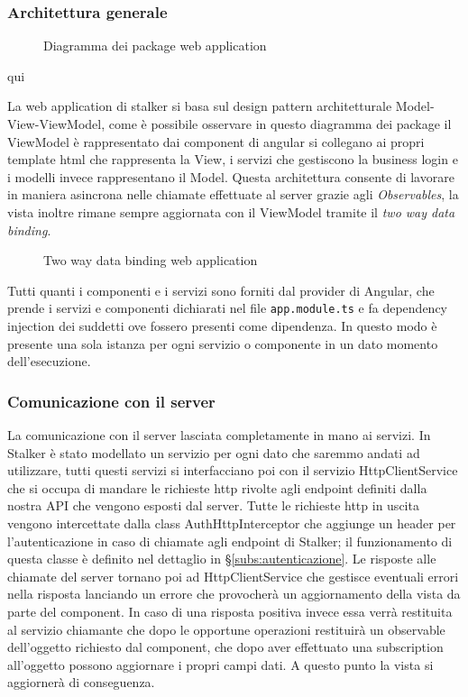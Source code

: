 \documentclass[../../manuale-manutentore.tex]{subfiles}
\begin{document}
\subsubsection{Architettura generale}%
\label{subs:architettura_generale}

\begin{figure}[H]
  \centering
  \caption{Diagramma dei package web application}%
  \label{fig:web-app-package-diagram}
\end{figure} qui

La web application di stalker si basa sul design pattern architetturale Model-View-ViewModel, come è possibile osservare in questo diagramma dei package il ViewModel è rappresentato dai component di angular si collegano ai propri template html che rappresenta la View, i servizi che gestiscono la business login e i modelli invece rappresentano il Model.
Questa architettura consente di lavorare in maniera asincrona nelle chiamate effettuate al server grazie agli \textit{Observables}, la vista inoltre rimane sempre aggiornata con il ViewModel tramite il \textit{two way data binding}.
\begin{figure}[H]
  \centering
  \caption{Two way data binding web application}%
  \label{fig:web-app-databinding}
\end{figure}

Tutti quanti i componenti e i servizi sono forniti dal provider di Angular, che prende i servizi e componenti dichiarati nel file \texttt{app.module.ts} e fa dependency injection dei suddetti ove fossero presenti come dipendenza.
In questo modo è presente una sola istanza per ogni servizio o componente in un dato momento dell'esecuzione.


\subsubsection{Comunicazione con il server}%
\label{subs:comunicazione_server}

La comunicazione con il server lasciata completamente in mano ai servizi.
In Stalker è stato modellato un servizio per ogni dato che saremmo andati ad utilizzare, tutti questi servizi si interfacciano poi con il servizio HttpClientService che si occupa di mandare le richieste http rivolte agli endpoint definiti dalla nostra API che vengono esposti dal server.
Tutte le richieste http in uscita vengono intercettate dalla class AuthHttpInterceptor che aggiunge un header per l'autenticazione in caso di chiamate agli endpoint di Stalker; il funzionamento di questa classe è definito nel dettaglio in §\ref{subs:autenticazione}.
Le risposte alle chiamate del server tornano poi ad HttpClientService che gestisce eventuali errori nella risposta lanciando un errore che provocherà un aggiornamento della vista da parte del component. In caso di una risposta positiva invece essa verrà restituita al servizio chiamante che dopo le opportune operazioni restituirà un observable dell'oggetto richiesto dal component, che dopo aver effettuato una subscription all'oggetto possono aggiornare i propri campi dati.
A questo punto la vista si aggiornerà di conseguenza.
\end{document}
